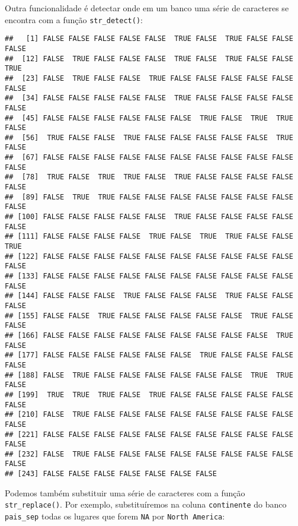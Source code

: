 \documentclass[]{book}
\newenvironment{Shaded}{\begin{snugshade}}{\end{snugshade}}
\newcommand{\KeywordTok}[1]{\textcolor[rgb]{0.13,0.29,0.53}{\textbf{#1}}}
\newcommand{\NormalTok}[1]{#1}
\newcommand{\OperatorTok}[1]{\textcolor[rgb]{0.81,0.36,0.00}{\textbf{#1}}}
\newcommand{\StringTok}[1]{\textcolor[rgb]{0.31,0.60,0.02}{#1}}
\theoremstyle{definition}
\theoremstyle{definition}
\theoremstyle{definition}
\theoremstyle{remark}
\begin{document}
Outra funcionalidade é detectar onde em um banco uma série de caracteres se encontra com a função \texttt{str\_detect()}:

\begin{Shaded}
\end{Shaded}

\begin{verbatim}
##   [1] FALSE FALSE FALSE FALSE FALSE  TRUE FALSE  TRUE FALSE FALSE FALSE
##  [12] FALSE  TRUE FALSE FALSE FALSE  TRUE FALSE  TRUE FALSE FALSE  TRUE
##  [23] FALSE  TRUE FALSE FALSE  TRUE FALSE FALSE FALSE FALSE FALSE FALSE
##  [34] FALSE FALSE FALSE FALSE FALSE  TRUE FALSE FALSE FALSE FALSE FALSE
##  [45] FALSE FALSE FALSE FALSE FALSE FALSE  TRUE FALSE  TRUE  TRUE FALSE
##  [56]  TRUE FALSE FALSE  TRUE FALSE FALSE FALSE FALSE FALSE  TRUE FALSE
##  [67] FALSE FALSE FALSE FALSE FALSE FALSE FALSE FALSE FALSE FALSE FALSE
##  [78]  TRUE FALSE  TRUE  TRUE FALSE  TRUE FALSE FALSE FALSE FALSE FALSE
##  [89] FALSE  TRUE  TRUE FALSE FALSE FALSE FALSE FALSE FALSE FALSE FALSE
## [100] FALSE FALSE FALSE FALSE FALSE  TRUE FALSE FALSE FALSE FALSE FALSE
## [111] FALSE FALSE FALSE FALSE  TRUE FALSE  TRUE  TRUE FALSE FALSE  TRUE
## [122] FALSE FALSE FALSE FALSE FALSE FALSE FALSE FALSE FALSE FALSE FALSE
## [133] FALSE FALSE FALSE FALSE FALSE FALSE FALSE FALSE FALSE FALSE FALSE
## [144] FALSE FALSE FALSE  TRUE FALSE FALSE FALSE  TRUE FALSE FALSE FALSE
## [155] FALSE FALSE  TRUE FALSE FALSE FALSE FALSE FALSE  TRUE FALSE FALSE
## [166] FALSE FALSE FALSE FALSE FALSE FALSE FALSE FALSE FALSE  TRUE FALSE
## [177] FALSE FALSE FALSE FALSE FALSE FALSE  TRUE FALSE FALSE FALSE FALSE
## [188] FALSE  TRUE FALSE FALSE FALSE FALSE FALSE FALSE  TRUE  TRUE FALSE
## [199]  TRUE  TRUE  TRUE FALSE  TRUE FALSE FALSE FALSE FALSE FALSE FALSE
## [210] FALSE  TRUE FALSE FALSE FALSE FALSE FALSE FALSE FALSE FALSE FALSE
## [221] FALSE FALSE FALSE FALSE FALSE FALSE FALSE FALSE FALSE FALSE FALSE
## [232] FALSE  TRUE FALSE FALSE FALSE FALSE FALSE FALSE FALSE FALSE FALSE
## [243] FALSE FALSE FALSE FALSE FALSE FALSE FALSE
\end{verbatim}

Podemos também substituir uma série de caracteres com a função \texttt{str\_replace()}. Por exemplo, substituíremos na coluna \texttt{continente} do banco \texttt{pais\_sep} todas os lugares que forem \texttt{NA} por \texttt{North\ America}:
\end{document}
